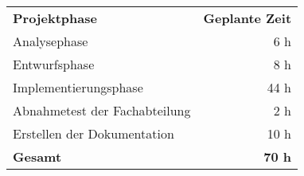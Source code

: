 \begin{tabular}{lr}
\rowcolor{heading}\textbf{Projektphase} & \textbf{Geplante Zeit} \\
Analysephase & 6 h \\
\rowcolor{odd}Entwurfsphase & 8 h \\
Implementierungsphase & 44 h \\
\rowcolor{odd}Abnahmetest der Fachabteilung & 2 h \\
Erstellen der Dokumentation & 10 h \\
\hline
\hline
\rowcolor{odd}\textbf{Gesamt} & \textbf{70 h} \\
\end{tabular}